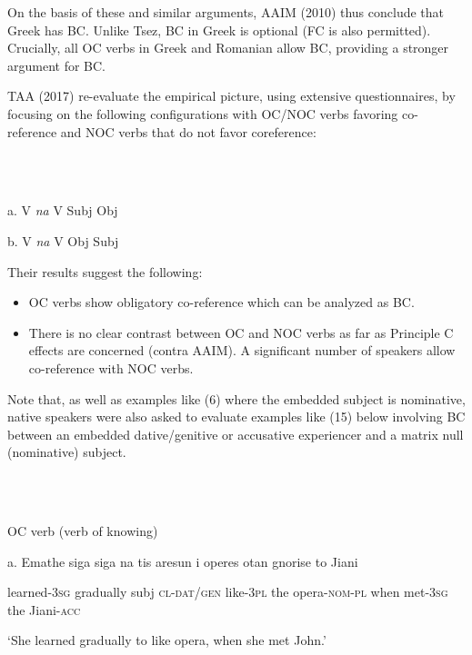 \documentclass[output=paper]{langsci/langscibook}
\begin{document}
\begin{stylePlainTexti}
  On the basis of these and similar arguments, AAIM (2010) thus conclude that Greek has BC. Unlike Tsez, BC in Greek is optional (FC is also permitted). Crucially, all OC verbs in Greek and Romanian allow BC, providing a stronger argument for BC.
\end{stylePlainTexti}

\begin{stylePlainTexti}
  TAA (2017) re-evaluate the empirical picture, using extensive questionnaires, by focusing on the following configurations with OC/NOC verbs favoring co-reference and NOC verbs that do not favor coreference:
\end{stylePlainTexti}

\ea%
    \label{ex:key:14}
    \gll\\
        \\
    \glt
    \z

          a.  V \textit{na} V Subj Obj

  b.  V \textit{na} V Obj Subj

Their results suggest the following:

\begin{itemize}
\item OC verbs show obligatory co-reference which can be analyzed as BC.
\item There is no clear contrast between OC and NOC verbs as far as Principle C effects are concerned (contra AAIM). A significant number of speakers allow co-reference with NOC verbs. 
\end{itemize}

Note that, as well as examples like (6) where the embedded subject is nominative, native speakers were also asked to evaluate examples like (15) below involving BC between an embedded dative/genitive or accusative experiencer and a matrix null (nominative) subject. 

\ea%
    \label{ex:key:15}
    \gll\\
        \\
    \glt
    \z

          OC verb (verb of knowing)

a.  Emathe siga siga na   tis aresun i operes otan   gnorise   to Jiani

learned-\textsc{3sg} gradually subj \textsc{cl-dat/gen} like-\textsc{3pl} the opera-\textsc{nom-pl} when met-\textsc{3sg} the Jiani-\textsc{acc} 

‘She learned gradually to like opera, when she met John.’
\end{document}
